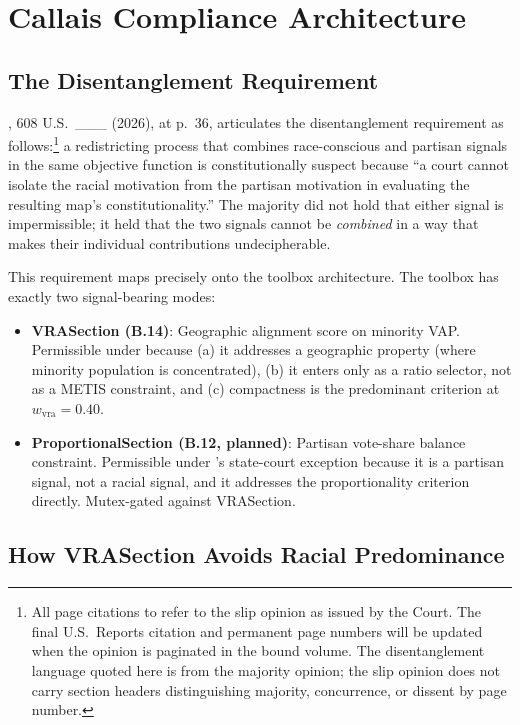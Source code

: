 \section{Callais Compliance Architecture}
\label{sec:callais}

\subsection{The Disentanglement Requirement}

\callais{}, 608 U.S.\ \_\_\_ (2026), at p.~36, articulates the disentanglement
requirement as follows:\footnote{%
  All page citations to \callais{} refer to the slip opinion as issued by the Court.
  The final U.S.\ Reports citation and permanent page numbers will be updated when
  the opinion is paginated in the bound volume.  The disentanglement language quoted
  here is from the majority opinion; the slip opinion does not carry section headers
  distinguishing majority, concurrence, or dissent by page number.}
a redistricting process that combines race-conscious and partisan signals in
the same objective function is constitutionally suspect because ``a court
cannot isolate the racial motivation from the partisan motivation in evaluating
the resulting map's constitutionality.''
The majority did not hold that either signal is impermissible; it held that
the two signals cannot be \emph{combined} in a way that makes their individual
contributions undecipherable.

This requirement maps precisely onto the toolbox architecture.
The toolbox has exactly two signal-bearing modes:
\begin{itemize}
  \item \textbf{VRASection (B.14)}: Geographic alignment score on minority VAP.
    Permissible under \callais{} because (a) it addresses a geographic property
    (where minority population is concentrated), (b) it enters only as a ratio
    selector, not as a METIS constraint, and (c) compactness is the predominant
    criterion at $w_\text{vra} = 0.40$.
  \item \textbf{ProportionalSection (B.12, planned)}: Partisan vote-share balance
    constraint.
    Permissible under \rucho{}'s state-court exception because it is a partisan
    signal, not a racial signal, and it addresses the proportionality criterion
    directly.
    Mutex-gated against VRASection.
\end{itemize}

\subsection{How VRASection Avoids Racial Predominance}

